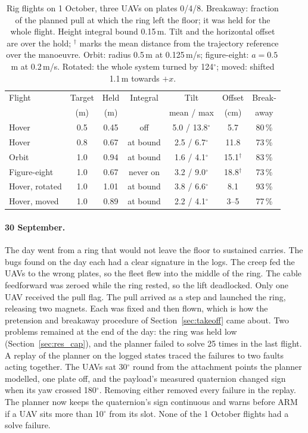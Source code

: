 \begin{table}[h]
\centering
\small
\caption{Rig flights on 1 October, three UAVs on plates 0/4/8. Breakaway: fraction of the planned
pull at which the ring left the floor; it was held for the whole flight. Height integral bound
0.15\,m. Tilt and the horizontal offset are over the hold; $^{\dagger}$ marks the mean distance from
the trajectory reference over the manoeuvre. Orbit: radius 0.5\,m at 0.125\,m/s; figure-eight:
$a = 0.5$\,m at 0.2\,m/s. Rotated: the whole system turned by 124$^\circ$; moved: shifted 1.1\,m
towards $+x$.}
\label{tab:rig_oct1}
\footnotesize
\begin{tabularx}{\textwidth}{>{\raggedright\arraybackslash}Xcccccc}
\toprule
Flight & Target & Held & Integral & Tilt & Offset & Break- \\
 & (m) & (m) & & mean / max & (cm) & away \\
\midrule
Hover & 0.5 & 0.45 & off & 5.0 / 13.8$^\circ$ & 5.7 & 80\,\% \\
Hover & 0.8 & 0.67 & at bound & 2.5 / 6.7$^\circ$ & 11.8 & 73\,\% \\
Orbit & 1.0 & 0.94 & at bound & 1.6 / 4.1$^\circ$ & 15.1$^{\dagger}$ & 83\,\% \\
Figure-eight & 1.0 & 0.67 & never on & 3.2 / 9.0$^\circ$ & 18.8$^{\dagger}$ & 73\,\% \\
Hover, rotated & 1.0 & 1.01 & at bound & 3.8 / 6.6$^\circ$ & 8.1 & 93\,\% \\
Hover, moved & 1.0 & 0.89 & at bound & 2.2 / 4.1$^\circ$ & 3--5 & 77\,\% \\
\bottomrule
\end{tabularx}
\end{table}

\paragraph{30 September.} The day went from a ring that would not leave the floor to sustained
carries. The bugs found on the day each had a clear signature in the logs. The creep fed the UAVs to the
wrong plates, so the fleet flew into the middle of the ring. The cable feedforward was zeroed while the
ring rested, so the lift deadlocked. Only one UAV received the pull flag. The pull arrived as a step
and launched the ring, releasing two magnets. Each was fixed and then flown, which is how the
pretension and breakaway procedure of Section~\ref{sec:takeoff} came about. Two problems remained at
the end of the day: the ring was held low (Section~\ref{sec:res_cap}), and the planner failed to solve 25 times in the last
flight.
A replay of the planner on the logged states traced the failures to two faults acting
together. The UAVs sat 30$^\circ$ round from the attachment points the planner modelled, one plate off,
and the payload's measured quaternion changed sign when its yaw crossed 180$^\circ$. Removing either
removed every failure in the replay. The planner now keeps the quaternion's sign continuous and
warns before ARM if a UAV sits more than 10$^\circ$ from its slot. None of the 1 October flights had a
solve failure.

